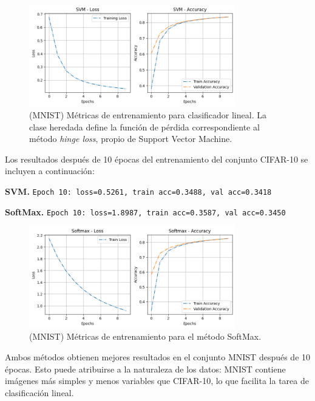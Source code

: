 \documentclass[a4paper,12pt]{article}
\begin{document}
\begin{figure}[h]
    \centering
    \includegraphics[width=0.8\textwidth]{ej3_svm_mnist.png}
    \caption{(MNIST) Métricas de entrenamiento para clasificador lineal. La clase heredada define la función de pérdida correspondiente al método \textit{hinge loss}, propio de Support Vector Machine. \label{fig:ej3:svm}}
\end{figure}


Los resultados después de 10 épocas del entrenamiento del conjunto CIFAR-10 se incluyen a continuación:


\noindent\textbf{SVM.} \texttt{Epoch 10: loss=0.5261, train acc=0.3488, val acc=0.3418}


\noindent\textbf{SoftMax.} \texttt{Epoch 10: loss=1.8987, train acc=0.3587, val acc=0.3450}

\begin{figure}[h]
    \centering
    \includegraphics[width=0.8\textwidth]{ej3_softmax_mnist.png}
    \caption{(MNIST) Métricas de entrenamiento para el método SoftMax. \label{fig:ej3:softmax}}
\end{figure}

Ambos métodos obtienen mejores resultados en el conjunto MNIST después de 10 épocas. Esto puede atribuirse a la naturaleza de los datos: MNIST contiene imágenes más simples y menos variables que CIFAR-10, lo que facilita la tarea de clasificación lineal. 
\end{document}
